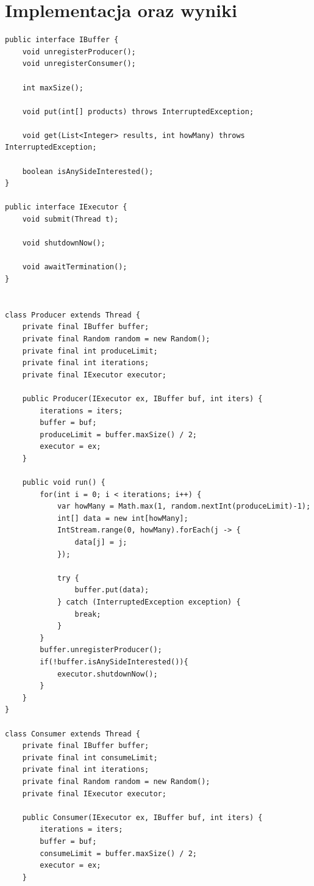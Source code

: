 \documentclass[12pt]{article}
\begin{document}
\section{Implementacja oraz wyniki}
\begin{verbatim}
public interface IBuffer {
    void unregisterProducer();
    void unregisterConsumer();

    int maxSize();

    void put(int[] products) throws InterruptedException;

    void get(List<Integer> results, int howMany) throws InterruptedException;

    boolean isAnySideInterested();
}

public interface IExecutor {
    void submit(Thread t);

    void shutdownNow();

    void awaitTermination();
}

                
class Producer extends Thread {
    private final IBuffer buffer;
    private final Random random = new Random();
    private final int produceLimit;
    private final int iterations;
    private final IExecutor executor;

    public Producer(IExecutor ex, IBuffer buf, int iters) {
        iterations = iters;
        buffer = buf;
        produceLimit = buffer.maxSize() / 2;
        executor = ex;
    }

    public void run() {
        for(int i = 0; i < iterations; i++) {
            var howMany = Math.max(1, random.nextInt(produceLimit)-1);
            int[] data = new int[howMany];
            IntStream.range(0, howMany).forEach(j -> {
                data[j] = j;
            });

            try {
                buffer.put(data);
            } catch (InterruptedException exception) {
                break;
            }
        }
        buffer.unregisterProducer();
        if(!buffer.isAnySideInterested()){
            executor.shutdownNow();
        }
    }
}

class Consumer extends Thread {
    private final IBuffer buffer;
    private final int consumeLimit;
    private final int iterations;
    private final Random random = new Random();
    private final IExecutor executor;

    public Consumer(IExecutor ex, IBuffer buf, int iters) {
        iterations = iters;
        buffer = buf;
        consumeLimit = buffer.maxSize() / 2;
        executor = ex;
    }


\end{verbatim}
\end{document}
